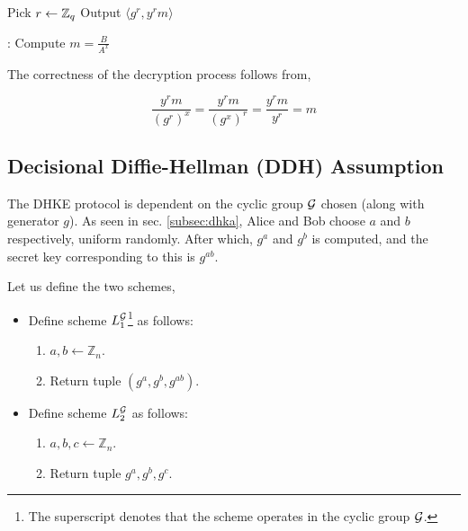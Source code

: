 \smallskip

\begin{algorithmic}
\STATE Pick $ r \leftarrow \mathbb{Z}_q $ 
\STATE Output $ \langle g^r, y^r m \rangle $ 
\end{algorithmic} 

\smallskip

\begin{algorithmic}
:
\STATE Compute $ m = \frac{B}{A^x} $ 
\end{algorithmic}

The correctness of the decryption process follows from,

\begin{equation*}
\frac{y^r m}{(g^r)^x} = \frac{y^r m}{(g^x)^r} = \frac{y^r m }{y^r} = m
\end{equation*}

\subsection{Decisional Diffie-Hellman (DDH) Assumption}

The DHKE protocol is dependent on the cyclic group \( \mathcal{G} \) chosen (along with generator \( g \)).
As seen in sec. \ref{subsec:dhka}, Alice and Bob choose \( a \) and \( b \) respectively, uniform randomly. 
After which, \( g^a \) and \( g^b \) is computed, and the secret key corresponding to this is \( g^{ab} \).

Let us define the two schemes,

\begin{itemize}
    \item Define scheme \( L_1^{\mathcal{G}} \)\footnote{The superscript denotes that the scheme operates in the cyclic group \( \mathcal{G} \).} as follows: 
    \begin{enumerate}
        \item \( a, b \leftarrow \mathbb{Z}_n \).
        \item Return tuple \( (g^a, g^b, g^{ab}) \).
    \end{enumerate}

    \item Define scheme \( L_2^{\mathcal{G}} \) as follows: 
    \begin{enumerate}
        \item \( a, b, c \leftarrow \mathbb{Z}_n \).
        \item Return tuple \( g^a, g^b, g^c \).
    \end{enumerate}
\end{itemize}


